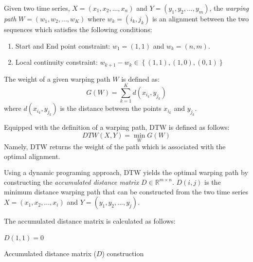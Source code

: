\iftoggle{edit-mode}{\hspace{0pt}\marginpar{Warping path Definition}}{}
\begin{definition}
Given two time series, $X = (x_1,x_2,...,x_n)$ and $Y = (y_1,y_2,...,y_m)$, the \emph{warping path} $W=(w_1,w_2,...,w_K)$ where ${w_k} = (i_k,j_k)$ is an alignment between the two sequences which satisfies the following conditions: 
\begin{enumerate}
\item Start and End point constraint: $w_1 = (1,1)$ and $w_k = (n,m)$. 
\item Local continuity constraint: ${w_{k + 1}} - {w_k} \in \left\{ {\left( {1,1} \right),\left( {1,0} \right),\left( {0,1} \right)} \right\}$
\end{enumerate}	 
The weight of a given warping path $W$ is defined as:
\begin{equation}
G(W) = \sum\limits_{k = 1}^{K} d(x_{i_k},y_{j_k} )
\end{equation}
where $d(x_{i_k},y_{j_k})$ is the distance between the points $x_{i_k}$ and $y_{j_k}$.
\end{definition}

\iftoggle{edit-mode}{\hspace{0pt}\marginpar{DTW Definition}}{}
Equipped with the definition of a warping path, DTW is defined as follows:
\begin{equation}
DTW(X,Y)=\min\limits_{W} {G(W)}
\end{equation}
Namely, DTW returns the weight of the path which is associated with the optimal alignment.

\iftoggle{edit-mode}{\hspace{0pt}\marginpar{Accumulated distance matrix}}{}
Using a dynamic programing approach, DTW yields the optimal warping path by constructing the \emph{accumulated distance matrix} $D \in \mathbb{R}^{m \times n}$. 
$D(i,j)$ is the minimum distance warping path that can be constructed from the two time series $X = \left( {{x_1},{x_2},...,{x_i}} \right)$ and $Y = \left( {{y_1},{y_2},...,{y_j}} \right)$.

The accumulated distance matrix is calculated as follows: 
\begin{algorithm}
$D(1,1) = 0$\;
\caption{Accumulated distance matrix ($D$) construction}
\label{alg:adm_dtw}
\end{algorithm}


